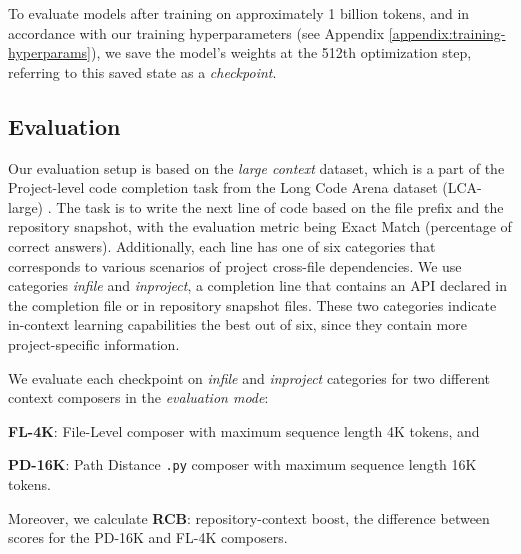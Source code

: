To evaluate models after training on approximately 1 billion tokens, and in accordance with our training hyperparameters (see Appendix \ref{appendix:training-hyperparams}), we save the model’s weights at the 512th optimization step, referring to this saved state as a \textit{checkpoint}.

\subsection{Evaluation}
Our evaluation setup is based on the \textit{large context} dataset, which is a part of the Project-level code completion task from the Long Code Arena dataset (LCA-large) \citep{LCA}. The task is to write the next line of code based on the file prefix and the repository snapshot, with the evaluation metric being Exact Match (percentage of correct answers). Additionally, each line has one of six categories that corresponds to various scenarios of project cross-file dependencies. We use categories \textit{infile} and \textit{inproject}, \ie a completion line that contains an API declared in the completion file or in repository snapshot files. These two categories indicate in-context learning capabilities the best out of six, since they contain more project-specific information.

We evaluate each checkpoint on \textit{infile} and \textit{inproject} categories for two different context composers in the \textit{evaluation mode}: 
\begin{inparaenum}[(1)]
\item \textbf{FL-4K}: File-Level composer with maximum sequence length 4K tokens, and
\item \textbf{PD-16K}: Path Distance \texttt{.py} composer with maximum sequence length 16K tokens.
\end{inparaenum} 
Moreover, we calculate \textbf{RCB}: repository-context boost, \ie the difference between scores for the PD-16K and FL-4K composers.
